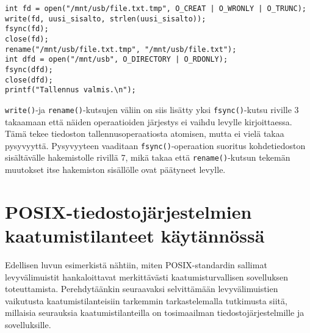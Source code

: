 \begin{samepage}
\begin{verbatim}
int fd = open("/mnt/usb/file.txt.tmp", O_CREAT | O_WRONLY | O_TRUNC);
write(fd, uusi_sisalto, strlen(uusi_sisalto));
fsync(fd);
close(fd);
rename("/mnt/usb/file.txt.tmp", "/mnt/usb/file.txt");
int dfd = open("/mnt/usb", O_DIRECTORY | O_RDONLY);
fsync(dfd);
close(dfd);
printf("Tallennus valmis.\n");
\end{verbatim}
\end{samepage}
%
\texttt{write()}-ja \texttt{rename()}-kutsujen väliin on siis lisätty yksi \texttt{fsync()}-kutsu riville 3 takaamaan että näiden operaatioiden järjestys ei vaihdu levylle kirjoittaessa.
Tämä tekee tiedoston tallennusoperaatiosta atomisen,
mutta ei vielä takaa pysyvyyttä.
Pysyvyyteen vaaditaan \texttt{fsync()}-operaation suoritus kohdetiedoston sisältävälle hakemistolle rivillä 7,
mikä takaa että \texttt{rename()}-kutsun tekemän muutokset itse hakemiston sisällölle ovat päätyneet levylle.

\section{POSIX-tiedostojärjestelmien kaatumistilanteet käytännössä}
\label{ChapPosixSafetyStudy}
Edellisen luvun esimerkistä nähtiin,
miten POSIX-standardin sallimat levyvälimuistit hankaloittavat merkittävästi kaatumisturvallisen sovelluksen toteuttamista.
Perehdytäänkin seuraavaksi selvittämään levyvälimuistien vaikutusta kaatumistilanteisiin tarkemmin tarkastelemalla tutkimusta siitä,
millaisia seurauksia kaatumistilanteilla on tosimaailman tiedostojärjestelmille ja sovelluksille.


